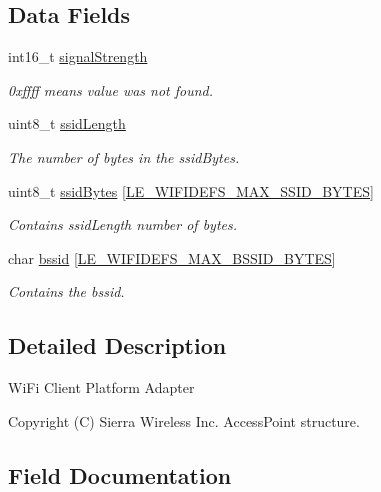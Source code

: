 \subsection*{Data Fields}
\begin{DoxyCompactItemize}
\item 
int16\+\_\+t \hyperlink{structpa__wifi_client___access_point__t_ab90c934c220c7ee22f20ac8bb1067dbf}{signal\+Strength}
\begin{DoxyCompactList}\small\item\em 0xffff means value was not found. \end{DoxyCompactList}\item 
uint8\+\_\+t \hyperlink{structpa__wifi_client___access_point__t_a58dc48bb34bb5bb57460b29c20612e84}{ssid\+Length}
\begin{DoxyCompactList}\small\item\em The number of bytes in the ssid\+Bytes. \end{DoxyCompactList}\item 
uint8\+\_\+t \hyperlink{structpa__wifi_client___access_point__t_a94c7b740ceb19475fc8a5014d45c4dc8}{ssid\+Bytes} \mbox{[}\hyperlink{le__wifi_defs__interface_8h_abba88ade60f4a8508fd8a1db0e1f9bc0}{L\+E\+\_\+\+W\+I\+F\+I\+D\+E\+F\+S\+\_\+\+M\+A\+X\+\_\+\+S\+S\+I\+D\+\_\+\+B\+Y\+T\+ES}\mbox{]}
\begin{DoxyCompactList}\small\item\em Contains ssid\+Length number of bytes. \end{DoxyCompactList}\item 
char \hyperlink{structpa__wifi_client___access_point__t_aab0cb346c9fad269aa5bd07bd33a4beb}{bssid} \mbox{[}\hyperlink{le__wifi_defs__interface_8h_aaf0dc3d2b7e5d8d1a29837cc55968751}{L\+E\+\_\+\+W\+I\+F\+I\+D\+E\+F\+S\+\_\+\+M\+A\+X\+\_\+\+B\+S\+S\+I\+D\+\_\+\+B\+Y\+T\+ES}\mbox{]}
\begin{DoxyCompactList}\small\item\em Contains the bssid. \end{DoxyCompactList}\end{DoxyCompactItemize}


\subsection{Detailed Description}
Wi\+Fi Client Platform Adapter

Copyright (C) Sierra Wireless Inc. Access\+Point structure. 

\subsection{Field Documentation}
